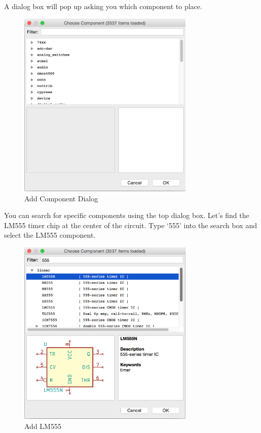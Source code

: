 \documentclass[12pt, oneside]{article}
\begin{document}
A dialog box will pop up asking you which component to place.
\begin{figure}[H]
\includegraphics[width=0.75\textwidth]{AddComponentDialog}
\centering
\caption{Add Component Dialog}
\end{figure}

You can search for specific components using the top dialog box. Let's find the LM555 timer chip at the center of the circuit. Type `555' into the search box and select the LM555 component.

\begin{figure}[H]
\includegraphics[width=0.75\textwidth]{AddLM555}
\centering
\caption{Add LM555}
\end{figure}
\end{document}
